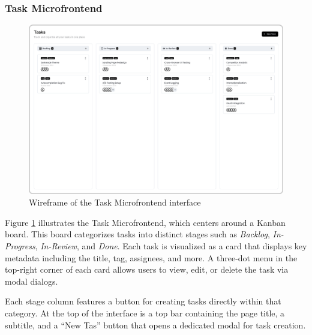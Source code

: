 \subsubsection*{Task Microfrontend}
\begin{figure}[h]
    \centerline{\includegraphics[width=1\textwidth]{images/wireframes/task-microfrontend.png}}
    \caption[Task Microfrontend wireframe]{Wireframe of the Task Microfrontend interface}
    \label{fig:task-wireframe}
\end{figure}
Figure \ref{fig:task-wireframe} illustrates the Task Microfrontend, which centers around a Kanban board. This board categorizes tasks into distinct stages such as \textit{Backlog}, \textit{In-Progress}, \textit{In-Review}, and \textit{Done}. Each task is visualized as a card that displays key metadata including the title, tag, assignees, and more. A three-dot menu in the top-right corner of each card allows users to view, edit, or delete the task via modal dialogs.

Each stage column features a button for creating tasks directly within that category. At the top of the interface is a top bar containing the page title, a subtitle, and a ``New Tas'' button that opens a dedicated modal for task creation.

